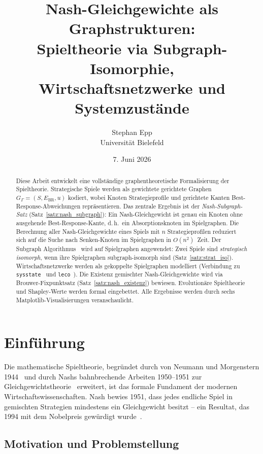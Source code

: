 ﻿\documentclass[a4paper,12pt]{article}
\title{Nash-Gleichgewichte als Graphstrukturen:\\
Spieltheorie via Subgraph-Isomorphie,\\
Wirtschaftsnetzwerke und Systemzust\"ande}
\author{Stephan Epp\\[4pt]
\small Universit\"at Bielefeld}
\date{7. Juni 2026}
\theoremstyle{definition}
\begin{document}
\maketitle

\begin{abstract}
Diese Arbeit entwickelt eine vollst\"andige graphentheoretische Formalisierung
der Spieltheorie. Strategische Spiele werden als gewichtete gerichtete Graphen
$G_\Gamma = (S, E_{\mathrm{BR}}, u)$ kodiert, wobei Knoten Strategieprofile
und gerichtete Kanten Best-Response-Abweichungen repr\"asentieren.
Das zentrale Ergebnis ist der \emph{Nash-Subgraph-Satz} (Satz~\ref{satz:nash_subgraph}):
Ein Nash-Gleichgewicht ist genau ein Knoten ohne ausgehende Best-Response-Kante,
d.\,h.\ ein Absorptionsknoten im Spielgraphen. Die Berechnung aller Nash-Gleichgewichte
eines Spiels mit $n$ Strategieprofilen reduziert sich auf die Suche nach
Senken-Knoten im Spielgraphen in $O(n^2)$~Zeit.
Der Subgraph Algorithmus~\cite{epp2026subgraph} wird auf Spielgraphen angewendet:
Zwei Spiele sind \emph{strategisch isomorph}, wenn ihre Spielgraphen
subgraph-isomorph sind (Satz~\ref{satz:strat_iso}).
Wirtschaftsnetzwerke werden als gekoppelte Spielgraphen modelliert
(Verbindung zu \texttt{sysstate}~\cite{epp2026sysstate} und
\texttt{leco}~\cite{epp2026leco}).
Die Existenz gemischter Nash-Gleichgewichte wird via Brouwer-Fixpunktsatz
(Satz~\ref{satz:nash_existenz}) bewiesen.
Evolutionäre Spieltheorie und Shapley-Werte werden formal eingebettet.
Alle Ergebnisse werden durch sechs Matplotlib-Visualisierungen veranschaulicht.
\end{abstract}

\tableofcontents
\newpage

\section{Einf\"uhrung}

Die mathematische Spieltheorie, begr\"undet durch von Neumann und Morgenstern
1944~\cite{vonneumann1944} und durch Nashs bahnbrechende Arbeiten 1950--1951
zur Gleichgewichtstheorie~\cite{nash1950,nash1951} erweitert, ist das formale
Fundament der modernen Wirtschaftswissenschaften. Nash bewies 1951, dass jedes
endliche Spiel in gemischten Strategien mindestens ein Gleichgewicht besitzt --
ein Resultat, das 1994 mit dem Nobelpreis gew\"urdigt wurde~\cite{nobel1994}.

\subsection{Motivation und Problemstellung}
\end{document}
